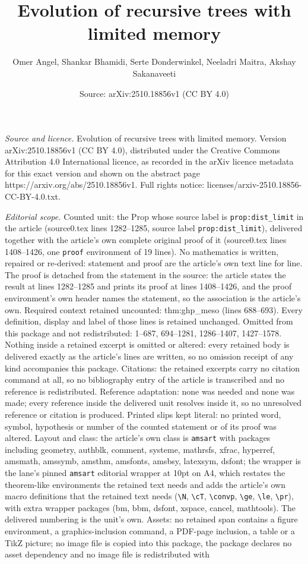 \documentclass[10pt,a4paper]{amsart}
\title[Evolution of recursive trees with limited memory]{Evolution of recursive trees with limited memory}
\author{Omer Angel, Shankar Bhamidi, Serte Donderwinkel, Neeladri Maitra, Akshay Sakanaveeti}
\date{Source: arXiv:2510.18856v1 (CC BY 4.0)}
\begin{document}
\maketitle

\noindent\emph{Source and licence.} Evolution of recursive trees with limited memory. Version arXiv:2510.18856v1 (CC BY 4.0), distributed under the Creative Commons Attribution 4.0 International licence, as recorded in the arXiv licence metadata for this exact version and shown on the abstract page https://arxiv.org/abs/2510.18856v1. Full rights notice: licenses/arxiv-2510.18856-CC-BY-4.0.txt.\par\smallskip

\noindent\textit{Editorial scope.} Counted unit: the Prop whose source label is \texttt{prop:dist\_limit} in the article (source0.tex lines 1282--1285, source label \texttt{prop:dist\_limit}), delivered together with the article's own complete original proof of it (source0.tex lines 1408--1426, one \texttt{proof} environment of 19 lines). No mathematics is written, repaired or re-derived: statement and proof are the article's own text line for line. The proof is detached from the statement in the source: the article states the result at lines 1282--1285 and prints its proof at lines 1408--1426, and the proof environment's own header names the statement, so the association is the article's own. Required context retained uncounted: thm:ghp\_meso (lines 688--693). Every definition, display and label of those lines is retained unchanged. Omitted from this package and not redistributed: 1--687, 694--1281, 1286--1407, 1427--1578. Nothing inside a retained excerpt is omitted or altered: every retained body is delivered exactly as the article's lines are written, so no omission receipt of any kind accompanies this package. Citations: the retained excerpts carry no citation command at all, so no bibliography entry of the article is transcribed and no reference is redistributed. Reference adaptation: none was needed and none was made; every reference inside the delivered unit resolves inside it, so no unresolved reference or citation is produced. Printed slips kept literal: no printed word, symbol, hypothesis or number of the counted statement or of its proof was altered. Layout and class: the article's own class is \texttt{amsart} with packages including geometry, authblk, comment, systeme, mathrsfs, xfrac, hyperref, amsmath, amssymb, amsthm, amsfonts, amsbsy, latexsym, dsfont; the wrapper is the lane's pinned \texttt{amsart} editorial wrapper at 10pt on A4, which restates the theorem-like environments the retained text needs and adds the article's own macro definitions that the retained text needs (\texttt{\textbackslash N}, \texttt{\textbackslash cT}, \texttt{\textbackslash convp}, \texttt{\textbackslash ge}, \texttt{\textbackslash le}, \texttt{\textbackslash pr}), with extra wrapper packages (bm, bbm, dsfont, xspace, cancel, mathtools). The delivered numbering is the unit's own. Assets: no retained span contains a figure environment, a graphics-inclusion command, a PDF-page inclusion, a table or a TikZ picture; no image file is copied into this package, the package declares no asset dependency and no image file is redistributed with 
\end{document}
